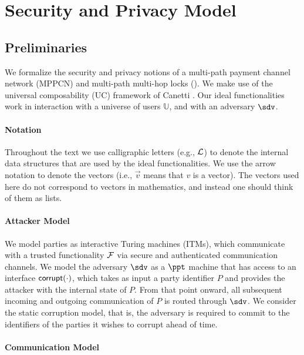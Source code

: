 \section{Security and Privacy Model}
\label{sec:security-model}

\subsection{Preliminaries}
\label{sec:model-prelims}

We formalize the security and privacy notions of a multi-path payment channel network (MPPCN) 
and multi-path multi-hop locks (\sysname). We make use of the universal composability (UC) 
framework of Canetti \cite{canetti}. Our ideal functionalities work in interaction with 
a universe of users $\mathbb{U}$, and with an adversary $\sdv$.

\paragraph{Notation}
Throughout the text we use calligraphic letters (e.g., $\mathcal{L}$) to denote the internal data 
structures that are used by the ideal functionalities. We use the arrow notation to denote 
the vectors (i.e., $\vec{v}$ means that $v$ is a vector). The vectors used here do not 
correspond to vectors in mathematics, and instead one should think of them as lists.

\paragraph{Attacker Model}
We model parties as interactive Turing machines (ITMs), which communicate with a trusted 
functionality $\mathcal{F}$ via secure and authenticated communication channels. We model the 
adversary $\sdv$ as a $\ppt$ machine that has access to an interface $\mathsf{corrupt}(\cdot)$, 
which takes as input a party identifier $P$ and provides the attacker with the internal 
state of $P$. From that point onward, all subsequent incoming and outgoing communication 
of $P$ is routed through $\sdv$. We consider the static corruption model, that is, the 
adversary is required to commit to the identifiers of the parties it wishes to corrupt 
ahead of time.

\paragraph{Communication Model}

